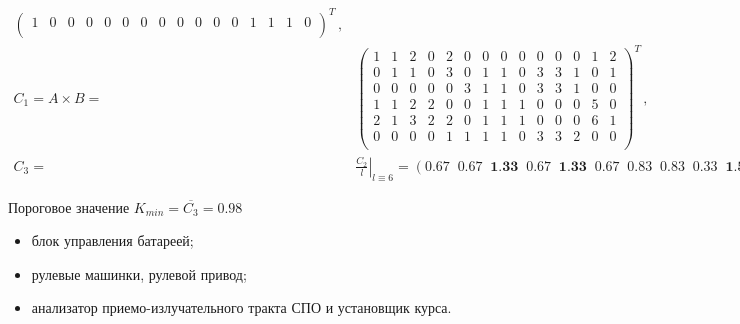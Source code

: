 \begin{frame}
\begin{equation*}
\begin{split}
\begin{pmatrix}
            1 & 0 & 0 & 0 & 0 & 0 & 0 & 0 & 0 & 0 & 0 & 0 & 1 & 1 & 1 & 0 \\
        \end{pmatrix}^T\,,{}\\
        C_1 = A \times B = &\begin{pmatrix}
            1 & 1 & 2 & 0 & 2 & 0 & 0 & 0 & 0 & 0 & 0 & 0 & 1 & 2 \\
            0 & 1 & 1 & 0 & 3 & 0 & 1 & 1 & 0 & 3 & 3 & 1 & 0 & 1 \\
            0 & 0 & 0 & 0 & 0 & 3 & 1 & 1 & 0 & 3 & 3 & 1 & 0 & 0 \\
            1 & 1 & 2 & 2 & 0 & 0 & 1 & 1 & 1 & 0 & 0 & 0 & 5 & 0 \\
            2 & 1 & 3 & 2 & 2 & 0 & 1 & 1 & 1 & 0 & 0 & 0 & 6 & 1 \\
            0 & 0 & 0 & 0 & 1 & 1 & 1 & 1 & 0 & 3 & 3 & 2 & 0 & 0 \\
        \end{pmatrix}^T\,,{}\\
        C_3 = &\left. \frac{C_2}{l} \right|_{l \equiv 6} = 
            \left( 0.67\;\; 0.67\;\; \textbf{1.33}\;\; 0.67\;\; \textbf{1.33}\;\; 0.67\;\; 0.83\;\; 0.83\;\; 
            0.33\;\; \textbf{1.50}\;\;\textbf{1.50}\;\; 0.67\;\; \textbf{2.00}\;\; 0.67 \right)^T\,.
    \end{split}
    \end{equation*} 

    Пороговое значение $K_{min} = \overline{C_3} = 0.98$
    \begin{itemize}
        \item[2.0]   блок управления батареей;
        \item[1.5]   рулевые машинки, рулевой привод;
        \item [1.33] анализатор приемо-излучательного тракта СПО и установщик курса.
    \end{itemize}
\end{frame}

